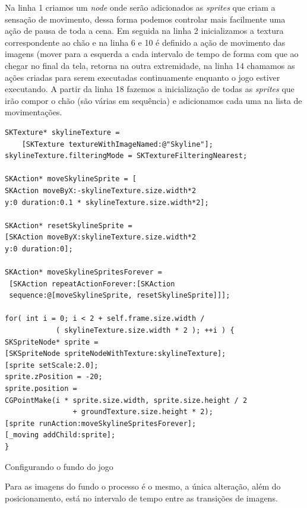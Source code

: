 \documentclass[a4paper,12pt,brazil,doubleside]{book}
\begin{document}
\begin{singlespace}
Na linha 1 criamos um \emph{node} onde serão adicionados as \emph{sprites} que criam a sensação de movimento, dessa forma podemos controlar mais facilmente uma ação de pausa de toda a cena. Em seguida na linha 2 inicializamos a textura correspondente ao chão e na linha 6 e 10 é definido a ação de movimento das imagens (mover para a esquerda a cada intervalo de tempo de forma com que ao chegar no final da tela, retorna na outra extremidade, na linha 14 chamamos as ações criadas para serem executadas continuamente enquanto o jogo estiver executando.
A partir da linha 18 fazemos a inicialização de todas as \emph{sprites} que irão compor o chão (são várias em sequência) e adicionamos cada uma na lista de movimentações.

\begin{listing}[H]
\begin{verbatim}
SKTexture* skylineTexture = 
	[SKTexture textureWithImageNamed:@"Skyline"];
skylineTexture.filteringMode = SKTextureFilteringNearest;
        
SKAction* moveSkylineSprite = [
SKAction moveByX:-skylineTexture.size.width*2 
y:0 duration:0.1 * skylineTexture.size.width*2];

SKAction* resetSkylineSprite = 
[SKAction moveByX:skylineTexture.size.width*2 
y:0 duration:0];

SKAction* moveSkylineSpritesForever =
 [SKAction repeatActionForever:[SKAction 
 sequence:@[moveSkylineSprite, resetSkylineSprite]]];
        
for( int i = 0; i < 2 + self.frame.size.width / 
			( skylineTexture.size.width * 2 ); ++i ) {
SKSpriteNode* sprite = 
[SKSpriteNode spriteNodeWithTexture:skylineTexture];
[sprite setScale:2.0];
sprite.zPosition = -20;
sprite.position = 
CGPointMake(i * sprite.size.width, sprite.size.height / 2 
				+ groundTexture.size.height * 2);
[sprite runAction:moveSkylineSpritesForever];
[_moving addChild:sprite];
}
\end{verbatim}
\caption{Configurando o fundo do jogo}
\end{listing}

Para as imagens do fundo o processo é o mesmo, a única alteração, além do posicionamento, está no intervalo de tempo entre as transições de imagens.


\end{singlespace}
\end{document}
